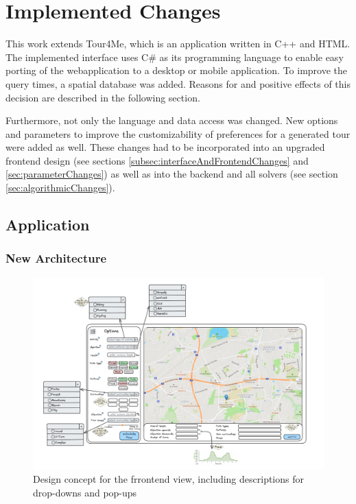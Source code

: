\chapter{Implemented Changes}
\label{chapter:implementedChanges}

This work extends Tour4Me, which is an application written in C++ and HTML. 
The implemented interface uses C\# as its programming language to enable easy porting of the webapplication to a desktop or mobile application.
To improve the query times, a spatial database was added. 
Reasons for and positive effects of this decision are described in the following section.

Furthermore, not only the language and data access was changed.
New options and parameters to improve the customizability of preferences for a generated tour were added as well.
These changes had to be incorporated into an upgraded frontend design (see sections \ref{subsec:interfaceAndFrontendChanges} and \ref{sec:parameterChanges}) as well as into the backend and all solvers (see section \ref{sec:algorithmicChanges}). 


\section{Application}
\label{sec:application}

\subsection{New Architecture}
\label{sec:newArchitecture}

\begin{figure}[H]
	\includegraphics[width=0.9\linewidth]{bilder/Concept new Frontend design.png}
	\caption{Design concept for the frrontend view, including descriptions for drop-downs and pop-ups}
	\label{fig:frontendConcept}
\end{figure}

